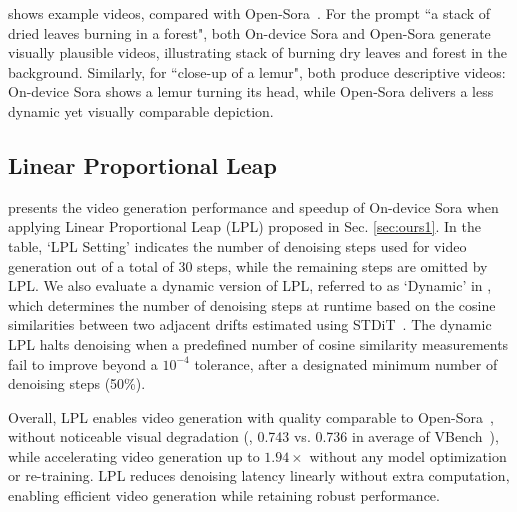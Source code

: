  shows example videos, compared with Open-Sora~\cite{opensora}. For the prompt ``a stack of dried leaves burning in a forest", both On-device Sora and Open-Sora generate visually plausible videos, illustrating stack of burning dry leaves and forest in the background. Similarly, for ``close-up of a lemur", both produce descriptive videos: On-device Sora shows a lemur turning its head, while Open-Sora delivers a less dynamic yet visually comparable depiction.





\subsection{Linear Proportional Leap}

 presents the video generation performance and speedup of On-device Sora when applying Linear Proportional Leap (LPL) proposed in Sec. \ref{sec:ours1}. In the table, `LPL Setting' indicates the number of denoising steps used for video generation out of a total of 30 steps, while the remaining steps are omitted by LPL. We also evaluate a dynamic version of LPL, referred to as `Dynamic' in , which determines the number of denoising steps at runtime based on the cosine similarities between two adjacent drifts estimated using STDiT~\cite{opensora}. The dynamic LPL halts denoising when a predefined number of cosine similarity measurements fail to improve beyond a $10^{-4}$ tolerance, after a designated minimum number of denoising steps (50\%).

Overall, LPL enables video generation with quality comparable to Open-Sora~\cite{opensora}, without noticeable visual degradation (\eg, 0.743 vs. 0.736 in average of VBench~\cite{huang2024vbench}),
while accelerating video generation up to $1.94\times$ without any model optimization or re-training. 
LPL reduces denoising latency linearly without extra computation, enabling efficient video generation while retaining robust performance.

